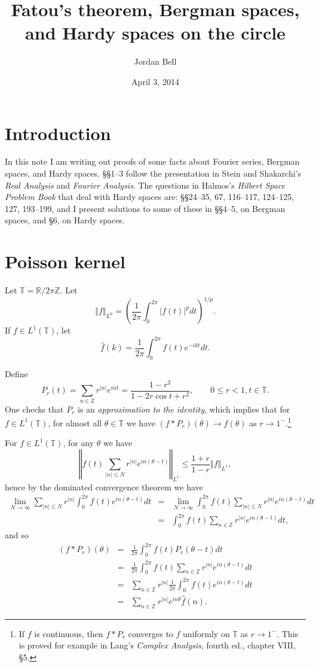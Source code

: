 \documentclass{article}
\newcommand{\norm}[1]{\left\Vert #1 \right\Vert}
\theoremstyle{definition}
\begin{document}
\title{Fatou's theorem, Bergman  spaces, and Hardy spaces on the  circle}
\author{Jordan Bell}
\date{April 3, 2014}
\maketitle

\section{Introduction}
In this note I am writing out proofs of some facts about Fourier series, Bergman spaces, and Hardy spaces. \S \S 1--3 follow the presentation in
Stein and Shakarchi's {\em Real Analysis}
and {\em Fourier Analysis}. The questions in Halmos's {\em Hilbert Space Problem Book} that deal with Hardy spaces are: \S \S 24--35,  67, 116--117,
124--125, 127, 193--199, and I present solutions to some of these in \S \S 4--5, on Bergman spaces, and \S 6, on Hardy spaces.


\section{Poisson kernel}
\label{poissonsection}
Let $\mathbb{T}=\mathbb{R} / 2\pi \mathbb{Z}$.  
Let 
\[
\norm{f}_{L^p} = \left( \frac{1}{2\pi} \int_0^{2\pi} |f(t)|^p dt \right)^{1/p}.
\]
If $f \in L^1(\mathbb{T})$, let
\[
\hat{f}(k)=\frac{1}{2\pi}\int_0^{2\pi} f(t) e^{-ikt}dt.
\] 



Define
\[
P_r(t)=\sum_{n \in \mathbb{Z}} r^{|n|} e^{int}=\frac{1-r^2}{1-2r\cos t + r^2}, \qquad 0 \leq r < 1, t \in \mathbb{T}.
\]
One checks that $P_r$ is an {\em approximation to the identity}, which implies that for $f \in L^1(\mathbb{T})$, for almost
all $\theta \in \mathbb{T}$ we have $(f * P_r)(\theta) \to f(\theta)$ as $r \to 1^-$.\footnote{If $f$ is continuous, then $f*P_r$ converges to $f$ uniformly on
$\mathbb{T}$ as $r \to 1^-$. This is proved for example in Lang's {\em Complex Analysis}, fourth ed., chapter VIII, \S 5.}

For $f \in L^1(\mathbb{T})$, for any $\theta$ we have
\[
\norm{f(t) \sum_{|n| \leq N} r^{|n|} e^{in(\theta-t)}}_{L^1} \leq \frac{1+r}{1-r} \norm{f}_{L^1},
\]
hence by the dominated convergence theorem we have
\begin{eqnarray*}
\lim_{N \to \infty} \sum_{|n| \leq N}  r^{|n|} \int_0^{2\pi} f(t)  e^{in(\theta-t)} dt 
&=&
\lim_{N \to \infty}  \int_0^{2\pi} f(t) \sum_{|n| \leq N} r^{|n|} e^{in(\theta-t)} dt\\
&=&\int_0^{2\pi} f(t) \sum_{n \in \mathbb{Z}} r^{|n|} e^{in(\theta-t)} dt,
\end{eqnarray*}
and so
\begin{eqnarray*}
(f*P_r)(\theta)&=&\frac{1}{2\pi}\int_0^{2\pi} f(t) P_r(\theta-t) dt\\
&=&\frac{1}{2\pi}\int_0^{2\pi} f(t)  \sum_{n \in \mathbb{Z}}  r^{|n|} e^{in(\theta-t)} dt\\
&=&\sum_{n \in \mathbb{Z}}  r^{|n|} \frac{1}{2\pi}\int_0^{2\pi} f(t)  e^{in(\theta-t)} dt\\
&=&\sum_{n \in \mathbb{Z}}  r^{|n|} e^{in\theta} \hat{f}(n).
\end{eqnarray*}
\end{document}

